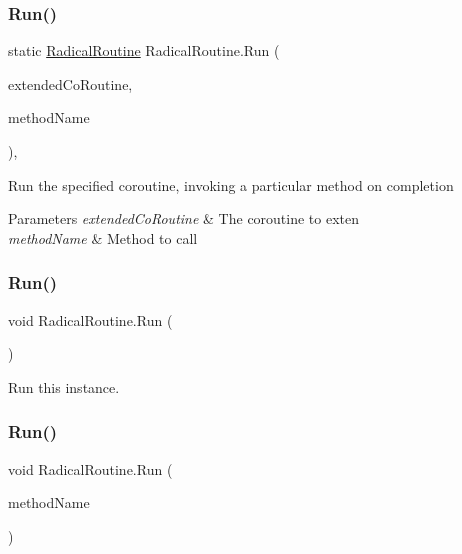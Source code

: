 \subsubsection{\texorpdfstring{Run()}{Run()}\hspace{0.1cm}{\footnotesize\ttfamily [2/5]}}
{\footnotesize\ttfamily static \hyperlink{class_radical_routine}{Radical\+Routine} Radical\+Routine.\+Run (\begin{DoxyParamCaption}\item[{I\+Enumerator}]{extended\+Co\+Routine,  }\item[{string}]{method\+Name }\end{DoxyParamCaption})\hspace{0.3cm}{\ttfamily [inline]}, {\ttfamily [static]}}



Run the specified coroutine, invoking a particular method on completion 


\begin{DoxyParams}{Parameters}
{\em extended\+Co\+Routine} & The coroutine to exten \\
\hline
{\em method\+Name} & Method to call \\
\hline
\end{DoxyParams}
\mbox{\label{class_radical_routine_a9449de246564f0d82a2890db45cbad94}} 
\subsubsection{\texorpdfstring{Run()}{Run()}\hspace{0.1cm}{\footnotesize\ttfamily [3/5]}}
{\footnotesize\ttfamily void Radical\+Routine.\+Run (\begin{DoxyParamCaption}{ }\end{DoxyParamCaption})\hspace{0.3cm}{\ttfamily [inline]}}



Run this instance. 

\mbox{\label{class_radical_routine_a2e4e2003e922bb66ff5352b1fa33a6fa}} 
\subsubsection{\texorpdfstring{Run()}{Run()}\hspace{0.1cm}{\footnotesize\ttfamily [4/5]}}
{\footnotesize\ttfamily void Radical\+Routine.\+Run (\begin{DoxyParamCaption}\item[{string}]{method\+Name }\end{DoxyParamCaption})\hspace{0.3cm}{\ttfamily [inline]}}



